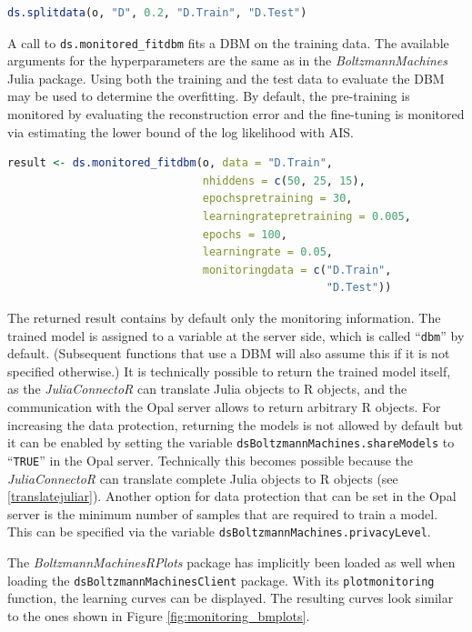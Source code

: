 \documentclass[12pt]{article}
\newcommand{\inlinecode}[1]{\texttt{#1}}
\newcommand{\apkg}[1]{\emph{#1}}
\begin{document}
\begin{lstlisting}[language=R, float=!h]
ds.splitdata(o, "D", 0.2, "D.Train", "D.Test")
\end{lstlisting}

A call to \inlinecode{ds.monitored\_fitdbm} fits a DBM on the training data.
The available arguments for the hyperparameters are the same as in the \apkg{BoltzmannMachines} Julia package.
Using both the training and the test data to evaluate the DBM may be used to determine the overfitting.
By default, the pre-training is monitored by evaluating the reconstruction error and the fine-tuning is monitored via estimating the lower bound of the log likelihood with AIS.
\begin{lstlisting}[language=R, float=!h]
result <- ds.monitored_fitdbm(o, data = "D.Train", 
                              nhiddens = c(50, 25, 15),
                              epochspretraining = 30,
                              learningratepretraining = 0.005,
                              epochs = 100,
                              learningrate = 0.05,
                              monitoringdata = c("D.Train",
                                                 "D.Test"))
\end{lstlisting}

The returned result contains by default only the monitoring information.
The trained model is assigned to a variable at the server side, which is called ``\inlinecode{dbm}'' by default.
(Subsequent functions that use a DBM will also assume this if it is not specified otherwise.)
It is technically possible to return the trained model itself, as the \apkg{JuliaConnectoR} can translate Julia objects to R objects, and the communication with the Opal server allows to return arbitrary R objects.
For increasing the data protection, returning the models is not allowed by default but it can be enabled by setting the variable \inlinecode{dsBoltzmannMachines.shareModels} to ``\inlinecode{TRUE}'' in the Opal server.
Technically this becomes possible because the \apkg{JuliaConnectoR} can translate complete Julia objects to R objects (see \ref{translatejuliar}).
Another option for data protection that can be set in the Opal server is the minimum number of samples that are required to train a model. This can be specified via the variable \inlinecode{dsBoltzmannMachines.privacyLevel}.

The \apkg{BoltzmannMachinesRPlots} package has implicitly been loaded as well when loading the \inlinecode{dsBoltzmannMachinesClient} package. 
With its \inlinecode{plotmonitoring} function, the learning curves \citep{ml_encyclopedia} can be displayed.
The resulting curves look similar to the ones shown in Figure \ref{fig:monitoring_bmplots}.
\end{document}
